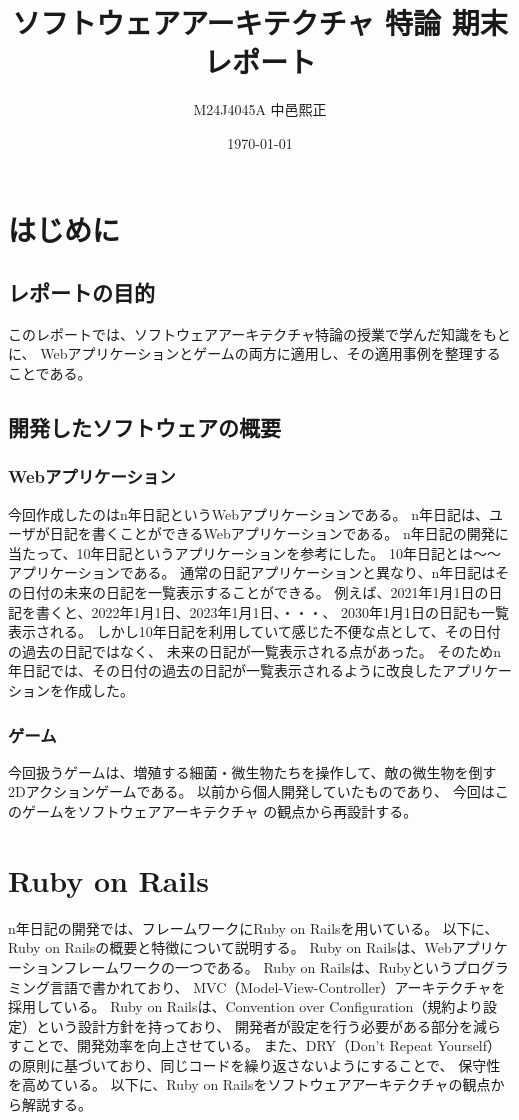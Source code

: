 \documentclass[dvipdfmx,fleqn,article]{jlreq}
\title{ソフトウェアアーキテクチャ 特論 期末レポート}
\author{M24J4045A 中邑熙正}
\date{\today}
\begin{document}
\maketitle
\thispagestyle{empty} %

\section{はじめに}
\subsection{レポートの目的}
このレポートでは、ソフトウェアアーキテクチャ特論の授業で学んだ知識をもとに、
Webアプリケーションとゲームの両方に適用し、その適用事例を整理することである。
\subsection{開発したソフトウェアの概要}
\subsubsection{Webアプリケーション}
今回作成したのはn年日記というWebアプリケーションである。
n年日記は、ユーザが日記を書くことができるWebアプリケーションである。
n年日記の開発に当たって、10年日記というアプリケーションを参考にした。
10年日記とは～～アプリケーションである。
通常の日記アプリケーションと異なり、n年日記はその日付の未来の日記を一覧表示することができる。
例えば、2021年1月1日の日記を書くと、2022年1月1日、2023年1月1日、・・・、
2030年1月1日の日記も一覧表示される。
しかし10年日記を利用していて感じた不便な点として、その日付の過去の日記ではなく、
未来の日記が一覧表示される点があった。
そのためn年日記では、その日付の過去の日記が一覧表示されるように改良したアプリケーションを作成した。

\subsubsection{ゲーム}
今回扱うゲームは、増殖する細菌・微生物たちを操作して、敵の微生物を倒す2Dアクションゲームである。
以前から個人開発していたものであり、
今回はこのゲームをソフトウェアアーキテクチャ
の観点から再設計する。

\section{Ruby on Rails}
n年日記の開発では、フレームワークにRuby on Railsを用いている。
以下に、Ruby on Railsの概要と特徴について説明する。
Ruby on Railsは、Webアプリケーションフレームワークの一つである。
Ruby on Railsは、Rubyというプログラミング言語で書かれており、
MVC（Model-View-Controller）アーキテクチャを採用している。
Ruby on Railsは、Convention over Configuration（規約より設定）という設計方針を持っており、
開発者が設定を行う必要がある部分を減らすことで、開発効率を向上させている。
また、DRY（Don't Repeat Yourself）の原則に基づいており、同じコードを繰り返さないようにすることで、
保守性を高めている。
以下に、Ruby on Railsをソフトウェアアーキテクチャの観点から解説する。
\end{document}
